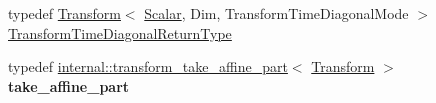 \begin{DoxyCompactItemize}
\item 
typedef \mbox{\hyperlink{class_eigen_1_1_transform}{Transform}}$<$ \mbox{\hyperlink{class_eigen_1_1_transform_a4e69ced9d651745b8ed4eda46f41795d}{Scalar}}, Dim, Transform\+Time\+Diagonal\+Mode $>$ \mbox{\hyperlink{class_eigen_1_1_transform_a51af5e8d8d9d9bfec091ff8aa5b7845a}{Transform\+Time\+Diagonal\+Return\+Type}}
\item 
\mbox{\label{class_eigen_1_1_transform_a9c105f3c0083254208966f3b53512b93}} 
typedef \mbox{\hyperlink{struct_eigen_1_1internal_1_1transform__take__affine__part}{internal\+::transform\+\_\+take\+\_\+affine\+\_\+part}}$<$ \mbox{\hyperlink{class_eigen_1_1_transform}{Transform}} $>$ {\bfseries take\+\_\+affine\+\_\+part}
\end{DoxyCompactItemize}
